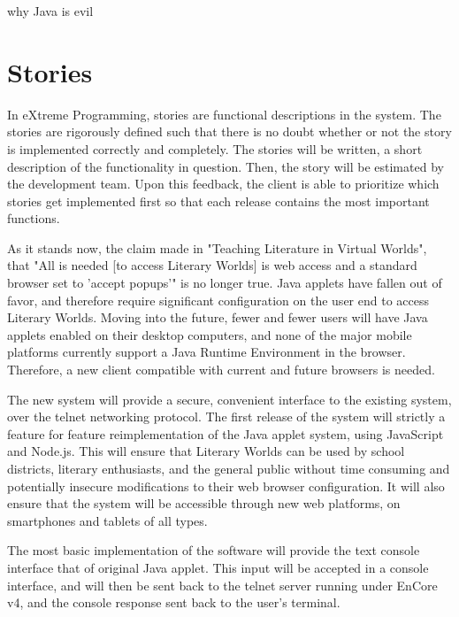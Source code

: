\documentclass[12pt, letterpaper]{report}
\begin{document}
	\par 
	why Java is evil
	
	
	\chapter{Stories}
	\par
	In eXtreme Programming, stories are functional descriptions in the system. The stories are rigorously defined such that there is no doubt whether or not the story is implemented correctly and completely. The stories will be written, a short description of the functionality in question. Then, the story will be estimated by the development team. Upon this feedback, the client is able to prioritize which stories get implemented first so that each release contains the most important functions.
	
	\par
	As it stands now, the claim made in "Teaching Literature in Virtual Worlds", that "All is needed [to access Literary Worlds] is web access and a standard browser set to 'accept popups'" is no longer true. Java applets have fallen out of favor, and therefore require significant configuration on the user end to access Literary Worlds. Moving into the future, fewer and fewer users will have Java applets enabled on their desktop computers, and none of the major mobile platforms currently support a Java Runtime Environment in the browser. Therefore, a new client compatible with current and future browsers is needed.
	
	\par
	The new system will provide a secure, convenient interface to the existing system, over the telnet networking protocol. The first release of the system will strictly a feature for feature reimplementation of the Java applet system, using JavaScript and Node.js. This will ensure that Literary Worlds can be used by school districts, literary enthusiasts, and the general public without time consuming and potentially insecure modifications to their web browser configuration. It will also ensure that the system will be accessible through new web platforms, on smartphones and tablets of all types.
	
	\par
	The most basic implementation of the software will provide the text console interface that of original Java applet. This input will be accepted in a console interface, and will then be sent back to the telnet server running under EnCore v4, and the console response sent back to the user's terminal.
	
\end{document}
